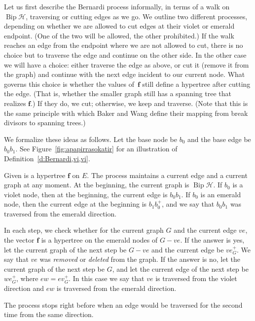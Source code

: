 \documentclass[ALCO,ThmDefs,Unicode,epreuves]{cedram}
\newcommand{\HH}{\mathcal H}
\DeclareMathOperator{\bip}{Bip}
\begin{document}
Let us first describe the Bernardi process informally, in terms of a walk on $\bip\HH$, traversing or cutting edges as we go. We outline two different processes, depending on whether we are allowed to cut edges at their violet or emerald endpoint. (One of the two will be allowed, the other prohibited.) If the walk reaches an edge from the endpoint where we are not allowed to cut, there is no choice but to traverse the edge and continue on the other side. In the other case we will have a choice: either traverse the edge as above, or cut it (remove it from the graph) and continue with the next edge incident to our current node. What governs this choice is whether the values of~$\mathbf f$ still define a hypertree after cutting the edge. (That is, whether the smaller graph still has a spanning tree that realizes $\mathbf f$.) If they do, we cut; otherwise, we keep and traverse. (Note that this is the same principle with which Baker and Wang define their mapping from break divisors to spanning trees.)

We formalize these ideas as follows. Let the base node be $b_0$ and the base edge be $b_0b_1$. See Figure~\ref{fig:apapirrasokatir} for an illustration of Definition~\ref{d:Bernardi,vi,vi}.

\begin{defi} \label{d:Bernardi,em,vi}
Given is a hypertree $\mathbf f$ on $E$. The process maintains a current edge and a current graph at any moment. At the beginning, the current graph is $\bip \HH$. If $b_0$ is a violet node, then at the beginning, the current edge is $b_0b_1$. If $b_0$ is an emerald node, then the current edge at the beginning is $b_1b_0^+$, and we say that $b_0b_1$ was traversed from the emerald direction.

In each step, we check whether for the current graph $G$ and the current edge $ve$, the vector $\mathbf f$ is a hypertree on the emerald nodes of $G-ve$. If the answer is yes, let the current graph of the next step be $G-ve$ and the current edge be $ve_G^+$. We say that $ve$ was \emph{removed} or \emph{deleted} from the graph. If the answer is no, let the current graph of the next step be $G$, and let the current edge of the next step be $we_G^+$, where $ew = ev_G^+$. In this case we say that $ve$ is traversed from the violet direction and $ew$ is traversed from the emerald direction.

The process stops right before when an edge would be traversed for the second time from the same direction.
\end{defi}
\end{document}
